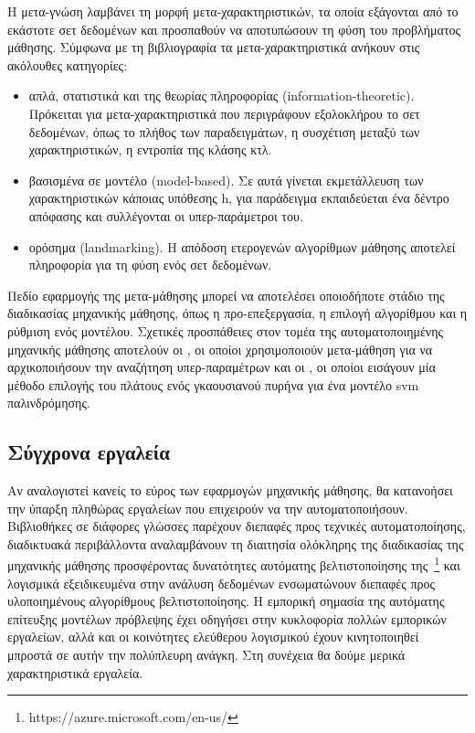  Η μετα-γνώση λαμβάνει τη μορφή μετα-χαρακτηριστικών, τα οποία εξάγονται από το εκάστοτε σετ δεδομένων και προσπαθούν να αποτυπώσουν τη φύση του προβλήματος μάθησης. Σύμφωνα με τη βιβλιογραφία \citep{Brazdil2009} τα μετα-χαρακτηριστικά ανήκουν στις ακόλουθες κατηγορίες:
 \begin{itemize}
 	\item απλά, στατιστικά και της θεωρίας πληροφορίας (information-theoretic). Πρόκειται για μετα-χαρακτηριστικά που περιγράφουν εξολοκλήρου το σετ δεδομένων, όπως το πλήθος των παραδειγμάτων, η συσχέτιση μεταξύ των χαρακτηριστικών, η εντροπία της κλάσης κτλ.
 	\item βασισμένα σε μοντέλο (model-based). Σε αυτά γίνεται εκμετάλλευση των χαρακτηριστικών κάποιας υπόθεσης h, για παράδειγμα εκπαιδεύεται ένα δέντρο απόφασης και συλλέγονται οι υπερ-παράμετροι του.
 	\item ορόσημα (landmarking). H απόδοση ετερογενών αλγορίθμων μάθησης αποτελεί πληροφορία για τη φύση ενός σετ δεδομένων. 
 \end{itemize}
 
 Πεδίο εφαρμογής της μετα-μάθησης μπορεί να αποτελέσει οποιοδήποτε στάδιο της διαδικασίας μηχανικής μάθησης, όπως η προ-επεξεργασία, η επιλογή αλγορίθμου και η ρύθμιση ενός μοντέλου. Σχετικές προσπάθειες στον τομέα της αυτοματοποιημένης μηχανικής μάθησης αποτελούν οι \citet{AAAI1510029}, οι οποίοι χρησιμοποιούν μετα-μάθηση για να αρχικοποιήσουν την αναζήτηση υπερ-παραμέτρων και οι \citet{Soares2004}, οι οποίοι εισάγουν μία μέθοδο επιλογής του πλάτους ενός γκαουσιανού πυρήνα για ένα μοντέλο svm παλινδρόμησης.   
 
 \subsection{Σύγχρονα εργαλεία} \label{section:tools}
 Αν αναλογιστεί κανείς το εύρος των εφαρμογών μηχανικής μάθησης, θα κατανοήσει την ύπαρξη πληθώρας εργαλείων που επιχειρούν να την αυτοματοποιήσουν. Βιβλιοθήκες σε διάφορες γλώσσες παρέχουν διεπαφές προς τεχνικές αυτοματοποίησης, διαδικτυακά περιβάλλοντα αναλαμβάνουν τη διαιτησία ολόκληρης της διαδικασίας της μηχανικής μάθησης προσφέροντας δυνατότητες αυτόματης βελτιστοποίησης της~\footnote{https://azure.microsoft.com/en-us/} και λογισμικά εξειδικευμένα στην ανάλυση δεδομένων ενσωματώνουν διεπαφές προς υλοποιημένους αλγορίθμους βελτιστοποίησης. Η εμπορική σημασία της αυτόματης επίτευξης μοντέλων πρόβλεψης έχει οδηγήσει στην κυκλοφορία πολλών εμπορικών εργαλείων, αλλά και οι κοινότητες ελεύθερου λογισμικού έχουν κινητοποιηθεί μπροστά σε αυτήν την πολύπλευρη ανάγκη. Στη συνέχεια θα δούμε μερικά χαρακτηριστικά εργαλεία.
